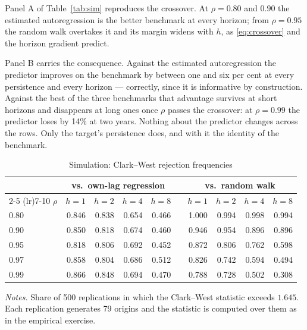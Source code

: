 \documentclass[12pt]{article}
\begin{document}
Panel A of Table~\ref{tab:sim} reproduces the crossover. At $\rho = 0.80$ and
$0.90$ the estimated autoregression is the better benchmark at every horizon;
from $\rho = 0.95$ the random walk overtakes it and its margin widens with $h$,
as \eqref{eq:crossover} and the horizon gradient predict.

Panel B carries the consequence. Against the estimated autoregression the
predictor improves on the benchmark by between one and six per cent at every
persistence and every horizon --- correctly, since it is informative by
construction. Against the best of the three benchmarks that advantage survives
at short horizons and disappears at long ones once $\rho$ passes the crossover:
at $\rho = 0.99$ the predictor loses by 14\% at two years. Nothing about the
predictor changes across the rows. Only the target's persistence does, and with
it the identity of the benchmark.

\begin{table}[htbp]
\centering
\caption{Simulation: Clark--West rejection frequencies}
\label{tab:siminf}
\begin{tabular}{lrrrrcrrrr}
\toprule
& \multicolumn{4}{c}{vs.\ own-lag regression} & &
  \multicolumn{4}{c}{vs.\ random walk} \\
\cmidrule(lr){2-5} \cmidrule(lr){7-10}
$\rho$ & $h{=}1$ & $h{=}2$ & $h{=}4$ & $h{=}8$ & & $h{=}1$ & $h{=}2$ & $h{=}4$ & $h{=}8$ \\
\midrule
0.80 & 0.846 & 0.838 & 0.654 & 0.466 & & 1.000 & 0.994 & 0.998 & 0.994 \\
0.90 & 0.850 & 0.818 & 0.674 & 0.460 & & 0.946 & 0.954 & 0.896 & 0.896 \\
0.95 & 0.818 & 0.806 & 0.692 & 0.452 & & 0.872 & 0.806 & 0.762 & 0.598 \\
0.97 & 0.858 & 0.804 & 0.686 & 0.512 & & 0.826 & 0.742 & 0.594 & 0.494 \\
0.99 & 0.866 & 0.848 & 0.694 & 0.470 & & 0.788 & 0.728 & 0.502 & 0.308 \\
\bottomrule
\end{tabular}

\vspace{0.5em}
\begin{minipage}{0.95\textwidth}
\footnotesize \textit{Notes.} Share of 500 replications in which the
Clark--West statistic exceeds $1.645$. Each replication generates 79 origins
and the statistic is computed over them as in the empirical exercise.
\end{minipage}
\end{table}
\end{document}
